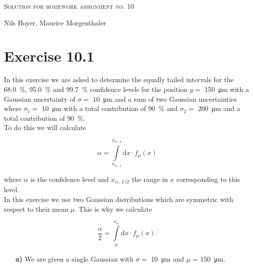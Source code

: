 \documentclass[10pt]{article}
\newenvironment{myfont}{\fontfamily{put}\selectfont}{\par}
\begin{document}
\begin{myfont}

\begin{center}
  \begin{Large}
    \textsc{Solution for homework assignment no. 10} \\
  \end{Large}
	\vspace*{0.4cm}
    Nils Hoyer, Maurice Morgenthaler
  \vspace*{1cm}
\end{center}

\section*{Exercise 10.1}

In this exercise we are asked to determine the equally tailed intervals for the \SI{68.0}{\percent}, \SI{95.0}{\percent} and \SI{99.7}{\percent} confidence levels for the position $y =$ \SI{150}{\micro\metre} with a Gaussian uncertainty of $\sigma =$ \SI{10}{\micro\metre} and a sum of two Gaussian uncertainties where $\sigma_{1} =$ \SI{10}{\micro\metre} with a total contribution of \SI{90}{\percent} and $\sigma_{2} =$  \SI{200}{\micro\metre} and a total contribution of \SI{90}{\percent}. \\

\noindent To do this we will calculate

\begin{equation}
  \alpha = \int\limits_{x_{\alpha\, ,\, 1}}^{x_{\alpha\, ,\, 2}} \textrm{d}x \cdot f_{\mu}(x)
\end{equation}

\noindent where $\alpha$ is the confidence level and $x_{\alpha \, , \, 1/2}$ the range in $x$ corresponding to this level. \\
In this exercise we use two Gaussian distributions which are symmetric with respect to their mean $\mu$.
This is why we calculate

\begin{equation}
  \frac{\alpha}{2} = \int\limits_{\mu}^{x_{\alpha}} \textrm{d}x \cdot f_{\mu}(x).
\end{equation}

\begin{itemize}
  \item[\textbf{a)}] We are given a single Gaussian with $\sigma =$ \SI{10}{\micro\metre} and $\mu$ = \SI{150}{\micro\metre}.


\end{itemize}
\end{myfont}
\end{document}

